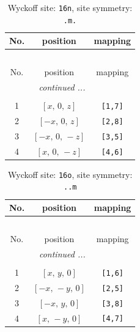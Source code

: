\documentclass[fleqn,8pt]{jsarticle}
\begin{document}
\renewcommand{\arraystretch}{1.2}
\begin{longtable}{ccc}
\caption{Wyckoff site: {\tt 16n}, site symmetry: {\tt .m.}}
 \\
 \hline \hline
No. & position & mapping \\ \hline \endfirsthead

\multicolumn{2}{l}{\tablename\ \thetable{}} \\
 \hline \hline
No. & position & mapping \\ \hline \endhead

 \hline \hline
\multicolumn{2}{r}{\footnotesize\it continued ...} \\ \endfoot

 \hline \hline
\multicolumn{2}{r}{} \\ \endlastfoot

1 & $\left[ x,\, 0,\, z \right]$ & {\tt [1,7]} \\ \hline
2 & $\left[ - x,\, 0,\, z \right]$ & {\tt [2,8]} \\ \hline
3 & $\left[ - x,\, 0,\, - z \right]$ & {\tt [3,5]} \\ \hline
4 & $\left[ x,\, 0,\, - z \right]$ & {\tt [4,6]} \\
\end{longtable}
\renewcommand{\arraystretch}{1.2}
\begin{longtable}{ccc}
\caption{Wyckoff site: {\tt 16o}, site symmetry: {\tt ..m}}
 \\
 \hline \hline
No. & position & mapping \\ \hline \endfirsthead

\multicolumn{2}{l}{\tablename\ \thetable{}} \\
 \hline \hline
No. & position & mapping \\ \hline \endhead

 \hline \hline
\multicolumn{2}{r}{\footnotesize\it continued ...} \\ \endfoot

 \hline \hline
\multicolumn{2}{r}{} \\ \endlastfoot

1 & $\left[ x,\, y,\, 0 \right]$ & {\tt [1,6]} \\ \hline
2 & $\left[ - x,\, - y,\, 0 \right]$ & {\tt [2,5]} \\ \hline
3 & $\left[ - x,\, y,\, 0 \right]$ & {\tt [3,8]} \\ \hline
4 & $\left[ x,\, - y,\, 0 \right]$ & {\tt [4,7]} \\
\end{longtable}
\end{document}
